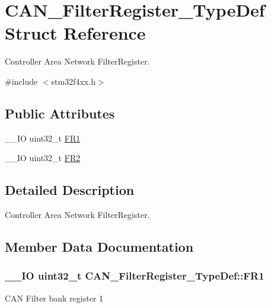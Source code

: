 \hypertarget{struct_c_a_n___filter_register___type_def}{}\section{C\+A\+N\+\_\+\+Filter\+Register\+\_\+\+Type\+Def Struct Reference}
\label{struct_c_a_n___filter_register___type_def}


Controller Area Network Filter\+Register.  




{\ttfamily \#include $<$stm32f4xx.\+h$>$}

\subsection*{Public Attributes}
\begin{DoxyCompactItemize}
\item 
\+\_\+\+\_\+\+I\+O uint32\+\_\+t \hyperlink{struct_c_a_n___filter_register___type_def_ac9bc1e42212239d6830582bf0c696fc5}{F\+R1}
\item 
\+\_\+\+\_\+\+I\+O uint32\+\_\+t \hyperlink{struct_c_a_n___filter_register___type_def_a77959e28a302b05829f6a1463be7f800}{F\+R2}
\end{DoxyCompactItemize}


\subsection{Detailed Description}
Controller Area Network Filter\+Register. 

\subsection{Member Data Documentation}
\hypertarget{struct_c_a_n___filter_register___type_def_ac9bc1e42212239d6830582bf0c696fc5}{}
\subsubsection[{F\+R1}]{\setlength{\rightskip}{0pt plus 5cm}\+\_\+\+\_\+\+I\+O uint32\+\_\+t C\+A\+N\+\_\+\+Filter\+Register\+\_\+\+Type\+Def\+::\+F\+R1}\label{struct_c_a_n___filter_register___type_def_ac9bc1e42212239d6830582bf0c696fc5}
C\+A\+N Filter bank register 1 \hypertarget{struct_c_a_n___filter_register___type_def_a77959e28a302b05829f6a1463be7f800}{}

